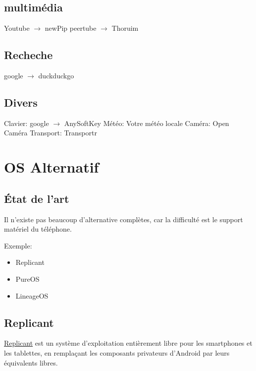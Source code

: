 \documentclass[compress]{beamer}
\begin{document}
\subsection{multimédia}
\begin{frame}
Youtube $\to$ newPip\newline
peertube $\to$ Thoruim
\end{frame}

\subsection{Recheche}
\begin{frame}
google $\to$ duckduckgo
\end{frame}

\subsection{Divers}
\begin{frame}
Clavier: google $\to$ AnySoftKey\newline
Météo: Votre météo locale\newline
Caméra: Open Caméra\newline
Transport: Transportr
\end{frame}



\section{OS Alternatif}

\subsection{État de l'art}
\begin{frame}
Il n'existe pas beaucoup d'alternative complètes, car la difficulté est le support matériel du téléphone.

Exemple:
\begin{itemize}
	\item Replicant
	\item PureOS
	\item LineageOS
\end{itemize}
\end{frame}

\subsection{Replicant}
\begin{frame}
\href{https://fr.wikipedia.org/wiki/Replicant_\%28syst\%C3\%A8me_d\%27exploitation\%29}{Replicant} est un système d'exploitation entièrement libre pour les smartphones et les tablettes, en remplaçant les composants privateurs d'Android par leurs équivalents libres.
\end{frame}
\end{document}
